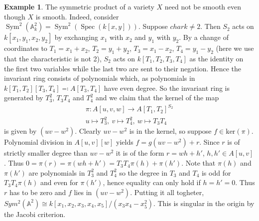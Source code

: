 \documentclass[11pt, a4paper, german]{article}
\theoremstyle{plain}
\theoremstyle{definition}
\newtheorem{example}[theorem]{Example}
\DeclareMathOperator{\Spec}{Spec}
\DeclareMathOperator{\Sym}{Sym}
\begin{document}
\begin{example}
    The symmetric product of a variety $X$ need not be smooth even though $X$ is smooth. 
    Indeed, consider $\Sym^2(\mathbb{A}_k^2) = \Sym^2(\Spec(k[x,y]))$. Suppose $char k \neq 2$.
    Then $S_2$ acts on $k[x_1,y_1,x_2,y_2]$ by exchanging $x_1$ with $x_2$ and $y_1$ with $y_2$. By a change of coordinates
    to $T_1 = x_1 + x_2$, $T_2 = y_1 + y_2$, $T_3 = x_1 - x_2$, $T_4 = y_1 - y_2$ (here we use that the characteristic is not 2),
    $S_2$ acts on $k[T_1,T_2,T_3,T_4]$ as the identity on the first two variables while the last two are sent to their negation.
    Hence the invariant ring consists of polynomials which, as polynomials in $k[T_1,T_2][T_3,T_4] \eqqcolon A[T_3,T_4]$ have even degree.
    So the invariant ring is generated by $T_3^2$, $T_3T_4$ and $T_4^2$ and we claim that the kernel of the map
    \begin{gather*}
        \pi \colon A[u,v,w] \to A[T_1,T_2]^{S_2}\\
        u \mapsto T_3^2,\ 
        v \mapsto T_4^2,\ 
        w \mapsto T_3T_4
    \end{gather*}
    is given by $(uv - w^2)$. Clearly $uv - w^2$ is in the kernel, so suppose $f \in \mathrm{ker}(\pi)$. 
    Polynomial division in $A[u,v][w]$ yields
    $f = g(uv - w^2) + r$. Since $r$ is of strictly smaller degree than $uv - w^2$ it is of the form $r = wh + h'$, $h, h' \in A[u,v]$.
    Thus $0 = \pi(r) = \pi(wh + h') = T_3T_4\pi(h) + \pi(h')$. 
    Note that $\pi(h)$ and $\pi(h')$ are polynomials in $T_3^2$ and $T_4^2$ so the degree in $T_3$ and $T_4$ is odd for 
    $T_3T_4\pi(h)$ and even for $\pi(h')$,
    hence equality can only hold if $h = h' = 0$. Thus $r$ has to be zero and $f$ lies in $(uv - w^2)$.
    Putting it all togheter, $Sym^2(\mathbb{A}^2) \cong k[x_1,x_2,x_3,x_4,x_5]/(x_3x_4 - x_5^2)$. This is singular in the origin by the Jacobi
    criterion.


\end{example}
\end{document}
